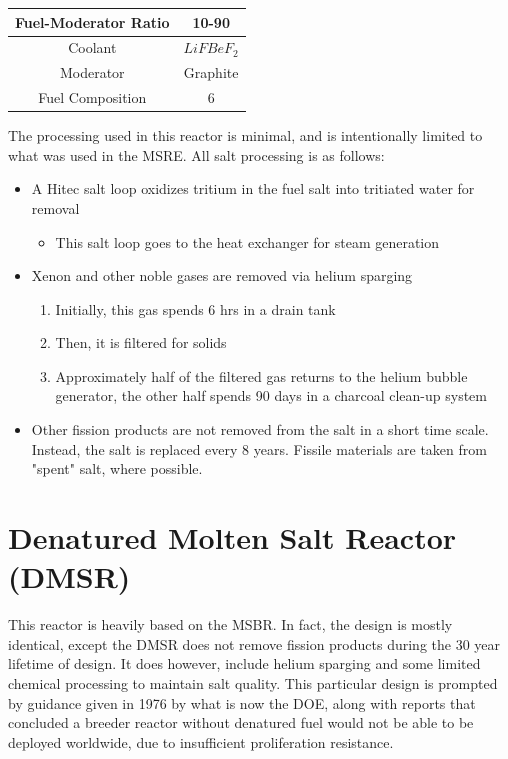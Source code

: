 \documentclass[letterpaper]{article}
\begin{document}
\begin{center}
\begin{tabular}{|c|c|}
\hline
Fuel-Moderator Ratio & 10-90 \\
\hline
Coolant & $LiFBeF_2$ \\
\hline
Moderator & Graphite \\
\hline
Fuel Composition & 6 \\
\hline
\end{tabular}
\end{center}

The processing used in this reactor is minimal, and is intentionally limited to what was used in the MSRE.  All salt processing is as follows:

\begin{itemize}
\item A Hitec salt loop oxidizes tritium in the fuel salt into tritiated water for removal
	\begin{itemize}
	\item This salt loop goes to the heat exchanger for steam generation
	\end{itemize}
\item Xenon and other noble gases are removed via helium sparging
	\begin{enumerate}
	\item Initially, this gas spends 6 hrs in a drain tank
	\item Then, it is filtered for solids
	\item Approximately half of the filtered gas returns to the helium bubble generator, the other half spends 90 days in a charcoal clean-up system
	\end{enumerate}
\item Other fission products are not removed from the salt in a short time scale.  Instead, the salt is replaced every 8 years.  Fissile materials are taken from "spent" salt, where possible.
\end{itemize}

\section{Denatured Molten Salt Reactor (DMSR)}

This reactor is heavily based on the MSBR.  In fact, the design is mostly identical, except the DMSR does not remove fission products during the 30 year lifetime of design.  It does however, include helium sparging and some limited chemical processing to maintain salt quality.  This particular design is prompted by guidance given in 1976 by what is now the DOE, along with reports that concluded a breeder reactor without denatured fuel would not be able to be deployed worldwide, due to insufficient proliferation resistance. \cite{engel_conceptual_1980}
\end{document}
